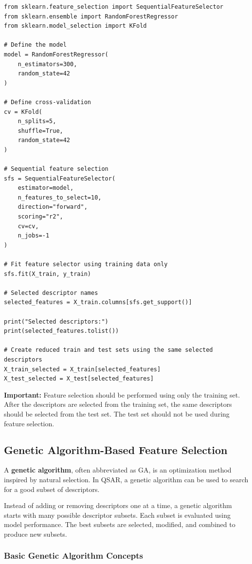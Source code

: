 \documentclass[11pt]{report}
\newenvironment{Important note}{\begin{quote}\color{red}\textbf{Important note:} }{\end{quote}}
\begin{document}
\begin{lstlisting}[style=pythonstyle, caption={Example of sequential feature selection using scikit-learn.}]
from sklearn.feature_selection import SequentialFeatureSelector
from sklearn.ensemble import RandomForestRegressor
from sklearn.model_selection import KFold

# Define the model
model = RandomForestRegressor(
    n_estimators=300,
    random_state=42
)

# Define cross-validation
cv = KFold(
    n_splits=5,
    shuffle=True,
    random_state=42
)

# Sequential feature selection
sfs = SequentialFeatureSelector(
    estimator=model,
    n_features_to_select=10,
    direction="forward",
    scoring="r2",
    cv=cv,
    n_jobs=-1
)

# Fit feature selector using training data only
sfs.fit(X_train, y_train)

# Selected descriptor names
selected_features = X_train.columns[sfs.get_support()]

print("Selected descriptors:")
print(selected_features.tolist())

# Create reduced train and test sets using the same selected descriptors
X_train_selected = X_train[selected_features]
X_test_selected = X_test[selected_features]
\end{lstlisting}

\textbf{Important:} Feature selection should be performed using only the training set. After the descriptors are selected from the training set, the same descriptors should be selected from the test set. The test set should not be used during feature selection.

\subsection{Genetic Algorithm-Based Feature Selection}

A \textbf{genetic algorithm}, often abbreviated as GA, is an optimization method inspired by natural selection. In QSAR, a genetic algorithm can be used to search for a good subset of descriptors.

Instead of adding or removing descriptors one at a time, a genetic algorithm starts with many possible descriptor subsets. Each subset is evaluated using model performance. The best subsets are selected, modified, and combined to produce new subsets.

\subsubsection*{Basic Genetic Algorithm Concepts}
\end{document}
